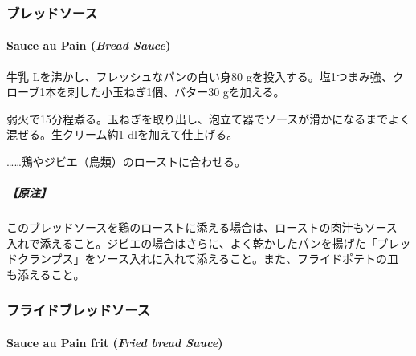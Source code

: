 \begin{recette}
\maeaki

\hypertarget{ux30d6ux30ecux30c3ux30c9ux30bdux30fcux30b9}{%
\subsubsection{ブレッドソース}\label{ux30d6ux30ecux30c3ux30c9ux30bdux30fcux30b9}}

\hypertarget{bread-sauce}{%
\paragraph{\texorpdfstring{Sauce au Pain (\emph{Bread
Sauce})}{Sauce au Pain (Bread Sauce)}}\label{bread-sauce}}


牛乳\undemi{} Lを沸かし、フレッシュなパンの白い身80
gを投入する。塩1つまみ強、クローブ1本を刺した小玉ねぎ1個、バター30
gを加える。

弱火で15分程煮る。玉ねぎを取り出し、泡立て器でソースが滑かになるまでよく混ぜる。生クリーム約1
dlを加えて仕上げる。

\ldots{}\ldots{}鶏やジビエ（鳥類）のローストに合わせる。

\hypertarget{ux539fux6ce8}{%
\subparagraph{【原注】}\label{ux539fux6ce8}}

このブレッドソースを鶏のローストに添える場合は、ローストの肉汁もソース
入れで添えること。ジビエの場合はさらに、よく乾かしたパンを揚げた「ブレッ
ドクランプス」をソース入れに入れて添えること。また、フライドポテトの皿
も添えること。

\maeaki

\hypertarget{ux30d5ux30e9ux30a4ux30c9ux30d6ux30ecux30c3ux30c9ux30bdux30fcux30b9}{%
\subsubsection{フライドブレッドソース}\label{ux30d5ux30e9ux30a4ux30c9ux30d6ux30ecux30c3ux30c9ux30bdux30fcux30b9}}

\hypertarget{fried-bread-sauce}{%
\paragraph{\texorpdfstring{Sauce au Pain frit (\emph{Fried bread
Sauce})}{Sauce au Pain frit (Fried bread Sauce)}}\label{fried-bread-sauce}}


\end{recette}
